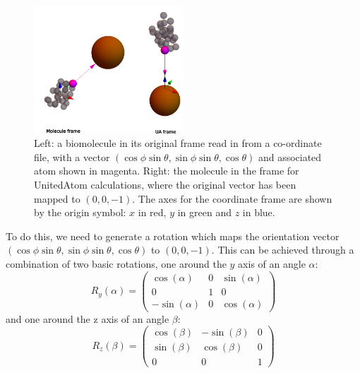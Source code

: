 \documentclass[10pt,a4paper,onecolumn]{report}
\begin{document}
\begin{figure} \label{fig:rotation_frames}
    \centering
    \includegraphics[width=0.5\textwidth]{figures/rotation_frames.png}
    \caption{Left: a biomolecule in its original frame read in from a co-ordinate file, with a vector $(\cos \phi \sin \theta, \sin \phi \sin \theta, \cos \theta)$ and associated atom shown in magenta. Right: the molecule in the frame for UnitedAtom calculations, where the original vector has been mapped to $(0,0,-1)$. The axes for the coordinate frame are shown by the origin symbol: $x$ in red, $y$ in green and $z$ in blue. }
\end{figure}


To do this, we need to generate a rotation which maps the orientation vector $( \cos \phi \sin \theta,  \sin \phi \sin \theta,  \cos \theta)$ to $  (0,0,-1)$. This can be achieved through a combination of two basic rotations, one around the $y$ axis of an angle $\alpha$:
\begin{equation}
R_y(\alpha) = \begin{pmatrix} \cos (\alpha) & 0 & \sin (\alpha) \\
 0 & 1 & 0 \\
 -\sin (\alpha) & 0 & \cos (\alpha) \end{pmatrix}
\end{equation}
and one around the z axis of an angle $\beta$:
\begin{equation}
R_z(\beta) =  \begin{pmatrix}  \cos (\beta) & -\sin (\beta) & 0 \\
 \sin (\beta) & \cos (\beta) & 0 \\
 0 & 0 & 1  \end{pmatrix}
\end{equation}
 
\end{document}
